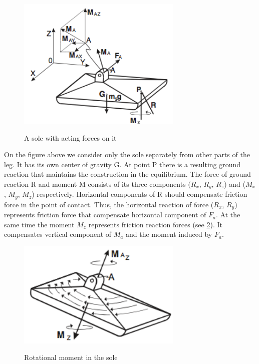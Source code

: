 \documentclass[12pt,a4paper]{report}
\begin{document}
		\begin{figure}[h!]
			\vspace{-0.2cm}
			\centering
			{\includegraphics[width=0.7\textwidth]{1}}
			\caption{A sole with acting forces on it}
			\label{fig:1}
			\vspace{-0.1cm}
		\end{figure}

		On the figure above we consider only the sole separately from other parts of the leg. It has its own center of gravity G. At point P there is a resulting ground reaction that maintains the construction in the equilibrium. The force of ground reaction R and moment M consists of its three components ($R_x$, $R_y$, $R_z$) and ($M_x$, $M_y$, $M_z$) respectively. Horizontal components of R should compensate friction force in the point of contact. Thus, the horizontal reaction of force ($R_x$, $R_y$) represents 
		friction force that compensate horizontal component of $F_a$. At the same time the moment $M_z$ represents friction reaction forces (see \cref{fig:2}).  It compensates vertical component of $M_a$ and the moment induced by $F_a$. \cite{vukobratovic2004zero}

		\begin{figure}[h!]
			\vspace{-0.2cm}
			\centering
			{\includegraphics[width=0.7\textwidth]{2}}
			\caption{Rotational moment in the sole}
			\label{fig:2}
			\vspace{-0.1cm}
		\end{figure}
\end{document}
